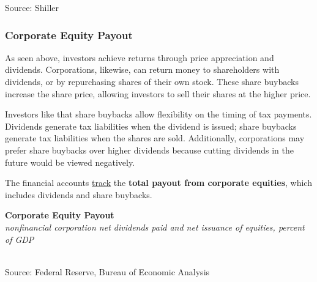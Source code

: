 \documentclass{report}
\makeatletter
\newcommand{\tbllink}[1]{\href{https://raw.githubusercontent.com/bdecon/US-chartbook/master/chartbook/data/#1}{\faTable}}
\newcommand*\short[1]{\expandafter\@gobbletwo\number\numexpr#1\relax}
\newcommand{\sbar}[4]{
		\addplot[ybar stacked, bar width=2.3pt, draw opacity=0, fill=#1] 
			table [x=#2, y=#3, col sep=comma]{#4};}
\newcommand{\dateaxisticks}{
		date coordinates in=x, axis line style={draw=none},
		xmax={2024-01-31},
		max space between ticks=40,	    
		xtick={{1990-01-01}, {1992-01-01}, {1994-01-01}, 
			{1996-01-01}, {1998-01-01}, {2000-01-01}, 
			{2002-01-01}, {2004-01-01}, {2006-01-01},
			{2008-01-01}, {2010-01-01}, {2012-01-01}, {2014-01-01},
		    {2016-01-01}, {2018-01-01}, {2020-01-01}, {2022-01-01}, 
		    {2024-01-01}, {2026-01-01}},
		minor xtick={{1989-01-01}, {1991-01-01}, {1993-01-01},
			{1995-01-01}, {1997-01-01}, {1999-01-01}, 
			{2001-01-01}, {2003-01-01}, {2005-01-01}, {2007-01-01},
		    {2009-01-01}, {2011-01-01}, {2013-01-01}, {2015-01-01},
		    {2017-01-01}, {2019-01-01}, {2021-01-01}, {2023-01-01}, 
		    {2025-01-01}, {2027-01-01}},
		enlarge y limits={0.06}, enlarge x limits={0.01},
		xticklabel style={align=center, yshift=-2pt}, tick label style={inner sep=0pt},
		}
\newcommand{\bbar}[2]{extra #1 ticks = {{#2}}, extra #1 tick labels = ,
		extra #1 tick style = {grid=major, grid style={thick, black!25}},}
\newcommand{\thickline}[4]{\addplot[ultra thick, no markers, color=#1] 
		table [x=#2, y=#3, col sep=comma] {#4};	}
\newcommand{\rbars}{
		\fill[color=black!10] (axis cs:{1990-07-01},\pgfkeysvalueof{/pgfplots/ymin})
			rectangle (axis cs:{1991-03-01}, \pgfkeysvalueof{/pgfplots/ymax});
		\fill[color=black!10] (axis cs:{2007-12-01},\pgfkeysvalueof{/pgfplots/ymin})
			rectangle (axis cs:{2009-07-01}, \pgfkeysvalueof{/pgfplots/ymax});
		\fill[color=black!10] (axis cs:{2001-03-01},\pgfkeysvalueof{/pgfplots/ymin})
			rectangle (axis cs:{2001-11-01}, \pgfkeysvalueof{/pgfplots/ymax});
		\fill[color=black!10] (axis cs:{2020-02-01},\pgfkeysvalueof{/pgfplots/ymin})
			rectangle (axis cs:{2020-05-01}, \pgfkeysvalueof{/pgfplots/ymax});}
\makeatother
\begin{document}
{\begin{minipage}{1.0\textwidth}
\hspace{1mm} 

\footnotesize{Source: Shiller} \hfill \tbllink{sp500dy.csv}
\end{minipage}
\newpage
\begin{minipage}{1.0\textwidth}  
\subsubsection*{Corporate Equity Payout}
\small As seen above, investors achieve returns through price appreciation and dividends. Corporations, likewise, can return money to shareholders with dividends, or by repurchasing shares of their own stock. These share buybacks increase the share price, allowing investors to sell their shares at the higher price. 

Investors like that share buybacks allow flexibility on the timing of tax payments. Dividends generate tax liabilities when the dividend is issued; share buybacks generate tax liabilities when the shares are sold. Additionally, corporations may prefer share buybacks over higher dividends because cutting dividends in the future would be viewed negatively. 

The financial accounts \href{https://www.federalreserve.gov/releases/z1/}{track} the \textbf{total payout from corporate equities}, which includes dividends and share buybacks. 
\vspace{1mm}

\normalsize \textbf{Corporate Equity Payout}\\
\footnotesize{\textit{nonfinancial corporation net dividends paid and net issuance of equities, percent of GDP}}\\
\hspace*{-1mm} \\
\footnotesize{Source: Federal Reserve, Bureau of Economic Analysis} \hfill \tbllink{eq_payout.csv}
\end{minipage}
\newpage
\begin{minipage}{1.0\textwidth}
 

\end{minipage}}
\end{document}
